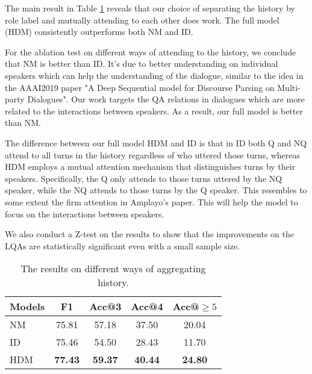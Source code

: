 The main result in Table \ref{tab:historyways} reveals that our choice 
of separating the history by role label and mutually attending to each other
does work. The full model (HDM) consistently outperforms both NM and ID. 


For the ablation test on different ways of attending to the history, we conclude that
NM is better than ID. It's due to better understanding on individual speakers which can
help the understanding of the dialogue, similar to the idea in 
the AAAI2019 paper "A Deep Sequential model for Discourse Parsing on Multi-party Dialogues". 
Our work targets the QA relations in dialogues which are more related to the interactions 
between speakers. As a result, our full model is better than NM. 

The difference between our full model HDM and ID is that in ID both Q and NQ attend to
all turns in the history regardless of who uttered those turns, whereas HDM employs a
mutual attention mechanism that distinguishes turns by their speakers. Specifically, the
Q only attends to those turns uttered by the NQ speaker, while the NQ attends to those
turns by the Q speaker. This resembles to some extent the firm attention in Amplayo's paper\cite{amplayo2018entity}.
This will help the model to focus on the interactions between speakers. 

We also conduct a Z-test on the 
results to show that the improvements on the LQAs are statistically 
significant even with a small sample size.

\begin{table}

	\centering
	\begin{tabular}{p{1.5cm}<{\centering}|c|ccc}
	\toprule[1.3pt]
	Models &F1&Acc@3&Acc@4&Acc@$\geq5$\\
	\midrule[1pt]
	NM&75.81&57.18&37.50&20.04 \\	
	ID&75.46&54.50&28.43&11.70\\
	HDM&\textbf{77.43}&\textbf{59.37}&\textbf{40.44}&\textbf{24.80}\\
	\bottomrule[1.3pt]
\end{tabular}
	\vspace{-0.25cm}
	\caption{The results on different ways of aggregating history.}
	\label{tab:historyways}
\end{table}


